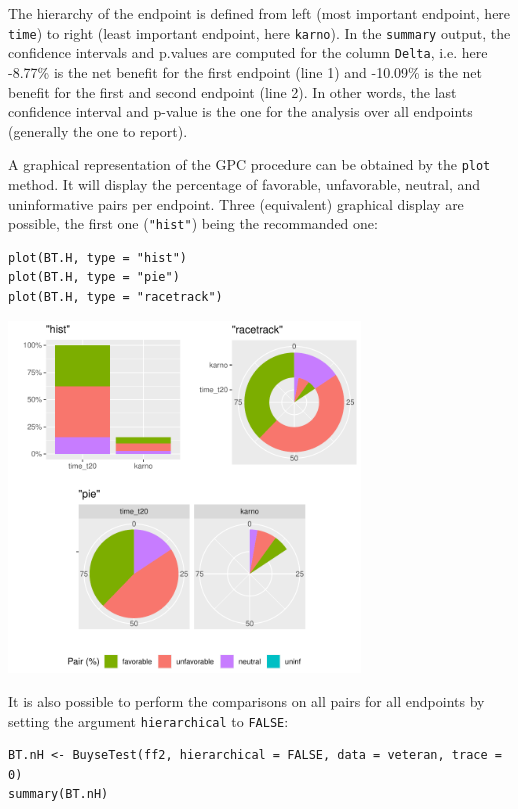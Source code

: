 \documentclass[12pt]{article}
\begin{document}
The hierarchy of the endpoint is defined from left (most important
endpoint, here \texttt{time}) to right (least important endpoint, here
\texttt{karno}). In the \texttt{summary} output, the confidence intervals and
p.values are computed for the column \texttt{Delta}, i.e. here -8.77\% is the
net benefit for the first endpoint (line 1) and -10.09\% is the net
benefit for the first and second endpoint (line 2). In other words,
the last confidence interval and p-value is the one for the analysis
over all endpoints (generally the one to report).

\bigskip

A graphical representation of the GPC procedure can be obtained by the
\texttt{plot} method. It will display the percentage of favorable,
unfavorable, neutral, and uninformative pairs per endpoint. Three
(equivalent) graphical display are possible, the first one (\texttt{"hist"})
being the recommanded one:
\lstset{language=r,label= ,caption= ,captionpos=b,numbers=none}
\begin{lstlisting}
plot(BT.H, type = "hist")
plot(BT.H, type = "pie")
plot(BT.H, type = "racetrack")
\end{lstlisting}

\begin{center}
\includegraphics[trim={0 0 0 0},width=0.7\textwidth]{./figures/plot-BuyseTest.pdf}
\end{center}


\bigskip

It is also possible to perform the comparisons on all pairs for all
endpoints by setting the argument \texttt{hierarchical} to \texttt{FALSE}:
\lstset{language=r,label= ,caption= ,captionpos=b,numbers=none}
\begin{lstlisting}
BT.nH <- BuyseTest(ff2, hierarchical = FALSE, data = veteran, trace = 0)
summary(BT.nH)
\end{lstlisting}
\end{document}
